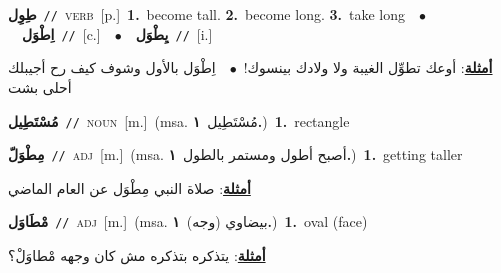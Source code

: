 \documentclass[10pt,a4paper,twoside]{article} %
\begin{document}
\begin{multicols}{2}
{\setlength\topsep{0pt}\textbf{\foreignlanguage{arabic}{طِوِل}}\ {\color{gray}\texttt{//}\color{black}}\ \textsc{verb}\ [p.]\ \textbf{1.}~become tall.  \textbf{2.}~become long.  \textbf{3.}~take long\ \ $\bullet$\ \ \setlength\topsep{0pt}\textbf{\foreignlanguage{arabic}{اِطْوَل}}\ {\color{gray}\texttt{//}\color{black}}\ [c.]\ \ $\bullet$\ \ \setlength\topsep{0pt}\textbf{\foreignlanguage{arabic}{يِطْوَل}}\ {\color{gray}\texttt{//}\color{black}}\ [i.]\  \begin{flushright}\color{gray}\foreignlanguage{arabic}{\textbf{\underline{\foreignlanguage{arabic}{أمثلة}}}: أوعك تطوِّل الغيبة ولا ولادك بينسوك!\ $\bullet$\ \  اِطْوَل بالأول وشوف كيف رح أجيبلك أحلى بشت}\end{flushright}\color{black}} \vspace{2mm}

{\setlength\topsep{0pt}\textbf{\foreignlanguage{arabic}{مُسْتَطِيل}}\ {\color{gray}\texttt{//}\color{black}}\ \textsc{noun}\ [m.]\ \color{gray}(msa. \foreignlanguage{arabic}{مُسْتَطِيل}~\foreignlanguage{arabic}{\textbf{١.}})\color{black}\ \textbf{1.}~rectangle\ } \vspace{2mm}

{\setlength\topsep{0pt}\textbf{\foreignlanguage{arabic}{مِطْوَلّ}}\ {\color{gray}\texttt{//}\color{black}}\ \textsc{adj}\ [m.]\ \color{gray}(msa. \foreignlanguage{arabic}{أصبح أطول ومستمر بالطول}~\foreignlanguage{arabic}{\textbf{١.}})\color{black}\ \textbf{1.}~getting taller\  \begin{flushright}\color{gray}\foreignlanguage{arabic}{\textbf{\underline{\foreignlanguage{arabic}{أمثلة}}}: صلاة النبي مِطْوَل عن العام الماضي}\end{flushright}\color{black}} \vspace{2mm}

{\setlength\topsep{0pt}\textbf{\foreignlanguage{arabic}{مْطَاوَل}}\ {\color{gray}\texttt{//}\color{black}}\ \textsc{adj}\ [m.]\ \color{gray}(msa. \foreignlanguage{arabic}{بيضاوي (وجه)}~\foreignlanguage{arabic}{\textbf{١.}})\color{black}\ \textbf{1.}~oval (face)\  \begin{flushright}\color{gray}\foreignlanguage{arabic}{\textbf{\underline{\foreignlanguage{arabic}{أمثلة}}}: يتذكره بتذكره مش كان وجهه مْطاوَلْ؟}\end{flushright}\color{black}} \vspace{2mm}


\end{multicols}
\end{document}
